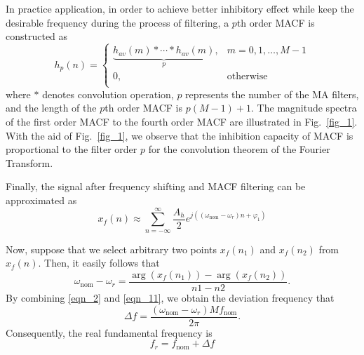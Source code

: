 \documentclass[journal,twoside]{IEEEtran}
\begin{document}
In practice application, in order to achieve better inhibitory effect while keep the desirable frequency during the process of filtering, a $p$th order MACF is constructed as
\begin{equation}
h_p(n)=\begin{cases}
\underbrace{h_{av}(m)*\cdots*h_{av}(m)}_{p},&m=0,1,\ldots,M-1\\
0,&\text{otherwise}\\
\end{cases}\label{eqn_9}
\end{equation}
where $*$ denotes convolution operation, $p$ represents the number of the MA filters, and the length of the $p$th order MACF is $p(M-1)+1$. The magnitude spectra of the first order MACF to the fourth order MACF are illustrated in Fig.~\ref{fig_1}. With the aid of Fig.~\ref{fig_1}, we observe that the inhibition capacity of MACF is proportional to the filter order $p$ for the convolution theorem of  the Fourier Transform.

Finally, the signal after frequency shifting and MACF filtering can be approximated  as
\begin{equation}
x_f(n)\approx\sum_{n=-\infty}^{\infty}\dfrac{A_h}{2}e^{j\left((\omega_\mathrm{nom}-\omega_r)n+\varphi_1\right)}\label{eqn_10}
\end{equation}


Now, suppose that we select arbitrary two points $x_f(n_1)$ and $x_f(n_2)$ from $x_f(n)$. Then, it easily follows that
\begin{equation}
\omega_\mathrm{nom}-\omega_r=\dfrac{\arg(x_f(n_1))-\arg(x_f(n_2))}{n1-n2}.\label{eqn_11}
\end{equation}
By combining \eqref{eqn_2} and \eqref{eqn_11}, we obtain the deviation frequency that
\begin{equation}
\Delta f=\dfrac{(\omega_\mathrm{nom}-\omega_r)Mf_\mathrm{nom}}{2\pi}.\label{eqn_12}
\end{equation}
Consequently, the real fundamental frequency is
\begin{equation}
f_r=f_\mathrm{nom}+\Delta f\label{eqn_13}
\end{equation}
\end{document}
